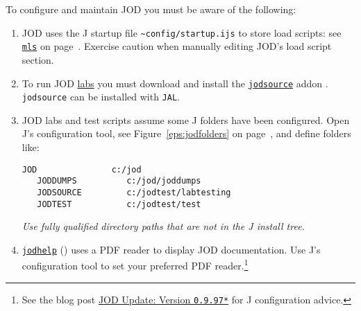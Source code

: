To configure and maintain JOD you must be aware of the following:
\begin{enumerate}
	\item JOD uses the J startup file \verb|~config/startup.ijs| to store load scripts: see 
	\hyperlink{il:mls}{\texttt{mls}} on page~\pageref{ss:mls}.  Exercise caution when manually
	editing JOD's load script section.
	\item To run JOD \href{http://www.jsoftware.com/help/user/lab_system_overview.htm}{labs} you must download and install the
	 \href{http://www.jsoftware.com/jwiki/Addons/general/jodsource}{\texttt{jodsource}} addon \cite{baker:jodsource}. 
	 \texttt{jodsource} can be installed with \texttt{JAL}.
	\item JOD labs and test scripts assume some J folders have been configured.  Open J's
	configuration tool, see Figure~\ref{eps:jodfolders} on 
   page~\pageref{eps:jodfolders}, and
	define folders like:
	\begin{lstlisting}[frame=single,framerule=0pt,label=lst:foldercfg]
   JOD               c:/jod
   JODDUMPS          c:/jod/joddumps
   JODSOURCE         c:/jodtest/labtesting
   JODTEST           c:/jodtest/test
  \end{lstlisting}
  \emph{Use fully qualified directory paths that are not in the J install tree.}
  \item \hyperlink{il:jodhelp}{\texttt{jodhelp}} (\pageref{ss:jodhelp}) uses a 
  PDF reader to display JOD documentation. Use J's configuration tool to set 
  your preferred PDF reader.\footnote{See the blog post \href{https://bakerjd99.wordpress.com/2015/02/08/mahin-and-carl/}{JOD Update: Version \texttt{0.9.97*}} for J configuration advice.
  } 
\end{enumerate} 



